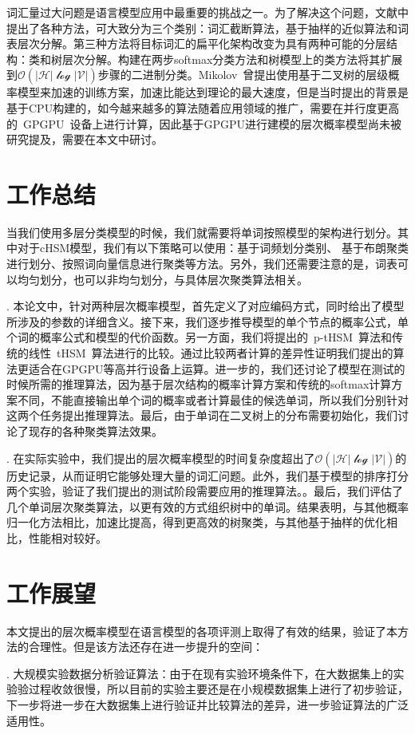 \summary
词汇量过大问题是语言模型应用中最重要的挑战之一。为了解决这个问题，文献中提出了各种方法，可大致分为三个类别：词汇截断算法，基于抽样的近似算法和词表层次分解。第三种方法将目标词汇的扁平化架构改变为具有两种可能的分层结构：类和树层次分解。构建在两步softmax分类方法和树模型上的类方法将其扩展到$\mathcal {O(| H | \log | V |)} $步骤的二进制分类。Mikolov~曾提出使用基于二叉树的层级概率模型来加速的训练方案，加速比能达到理论的最大速度，但是当时提出的背景是基于CPU构建的，如今越来越多的算法随着应用领域的推广，需要在并行度更高的~GPGPU~设备上进行计算，因此基于GPGPU进行建模的层次概率模型尚未被研究提及，需要在本文中研讨。
\section*{工作总结}
当我们使用多层分类模型的时候，我们就需要将单词按照模型的架构进行划分。其中对于cHSM模型，我们有以下策略可以使用：基于词频划分类别、 基于布朗聚类进行划分、按照词向量信息进行聚类等方法。另外，我们还需要注意的是，词表可以均匀划分，也可以非均匀划分，与具体层次聚类算法相关。


. 本论文中，针对两种层次概率模型，首先定义了对应编码方式，同时给出了模型所涉及的参数的详细含义。接下来，我们逐步推导模型的单个节点的概率公式，单个词的概率公式和模型的代价函数。另一方面，我们将提出的~p-tHSM~算法和传统的线性~tHSM~算法进行的比较。通过比较两者计算的差异性证明我们提出的算法更适合在GPGPU等高并行设备上运算。进一步的，我们还讨论了模型在测试的时候所需的推理算法，因为基于层次结构的概率计算方案和传统的softmax计算方案不同，不能直接输出单个词的概率或者计算最佳的候选单词，所以我们分别针对这两个任务提出推理算法。最后，由于单词在二叉树上的分布需要初始化，我们讨论了现存的各种聚类算法效果。

. 在实际实验中，我们提出的层次概率模型的时间复杂度超出了$\mathcal{O(|H|\log|V|)}$的历史记录，从而证明它能够处理大量的词汇问题。此外，我们基于模型的排序打分两个实验，验证了我们提出的测试阶段需要应用的推理算法。。最后，我们评估了几个单词层次聚类算法，以更有效的方式组织树中的单词。结果表明，与其他概率归一化方法相比，加速比提高，得到更高效的树聚类，与其他基于抽样的优化相比，性能相对较好。

\section*{工作展望}
本文提出的层次概率模型在语言模型的各项评测上取得了有效的结果，验证了本方法的合理性。但是该方法还存在进一步提升的空间：

. 大规模实验数据分析验证算法：由于在现有实验环境条件下，在大数据集上的实验验过程收敛很慢，所以目前的实验主要还是在小规模数据集上进行了初步验证，下一步将进一步在大数据集上进行验证并比较算法的差异，进一步验证算法的广泛适用性。

